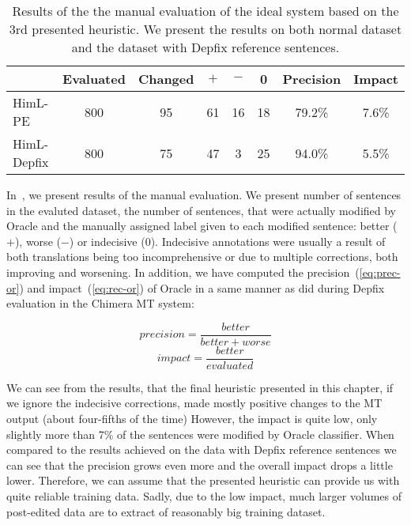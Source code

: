 \begin{table*}[t]
\centering
\small

\begin{tabular}{l|cc|ccc|cc}
  &  Evaluated  &  Changed  &  $+$  &  $-$  &  0  &  Precision  &  Impact  \\
\hline
HimL-PE  &  800  &  95  &  61  &  16  &  18  &  79.2\%  &  7.6\%  \\
HimL-Depfix  & 800  &  75  &  47  &  3  &  25  &  94.0\%  &  5.5\%  \\
\end{tabular}
\caption{
Results of the the manual evaluation of the ideal system based on the 3rd
presented heuristic. We present the results on both normal dataset and
the
dataset with Depfix reference sentences.
}
\label{oracle-maneval}
\end{table*}

In~, we present results of the manual evaluation.
We present number of sentences in the evaluted dataset, the number of sentences,
that were actually modified by Oracle and the manually assigned label given to each modified sentence:
better ($+$), worse ($-$) or indecisive (0).
Indecisive annotations were usually a result of both translations being
too incomprehensive or due to multiple corrections, both improving and worsening.
In addition, we have computed the precision~(\ref{eq:prec-or}) and
impact~(\ref{eq:rec-or}) of Oracle in a same manner as \citet{bojar-rosa-tamchyna:2013:WMT} did during Depfix evaluation in the Chimera MT system:

\begin{equation} \label{eq:prec-or}
precision = \frac{better}{better + worse}
\end{equation}
\begin{equation} \label{eq:rec-or}
impact = \frac{better}{evaluated}
\end{equation}

We can see from the results, that the final heuristic presented in this chapter,
if we ignore the indecisive corrections,
made mostly positive changes to the MT output (about four-fifths of the time)
However, the impact is quite low, only slightly more than 7\% of the sentences were modified
by Oracle classifier. When compared to the results achieved on the data with Depfix
reference sentences we can see that the precision grows even more
and the overall impact drops a little lower.
Therefore, we can assume that the presented heuristic can provide us with
quite reliable training data. Sadly, due to the low impact, much larger
volumes of post-edited data are to extract of reasonably big training dataset.

